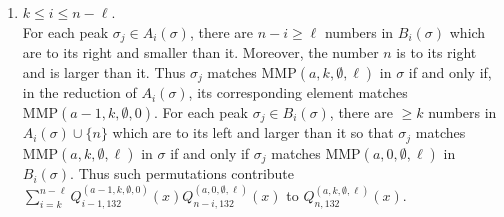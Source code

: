 \documentclass[
final,nomarks
]{dmtcs-episciences}
\newcommand{\Qmmn}[2]{Q_{#2,132}^{(#1)}(x)}
\newcommand{\MMP}{\mathrm{MMP}}
\begin{document}
\begin{enumerate}[{\bf Case }\bf 1.]
	\item \begin{math}k\leq i \leq n-\ell\end{math}.\\
	For each peak \begin{math}\sigma_j \in A_i(\sigma)\end{math},   
	there are \begin{math}n-i\geq \ell\end{math} numbers in \begin{math}B_i(\sigma)\end{math} which are to its right and smaller than it. 
	Moreover, the number \begin{math}n\end{math} is to its right and is larger than it.  
	Thus \begin{math}\sigma_j\end{math} matches \begin{math}\MMP(a,k,\emptyset,\ell)\end{math} in \begin{math}\sigma\end{math} if and only if, 
	in the reduction of \begin{math}A_i(\sigma)\end{math}, its corresponding element matches 
	\begin{math}\MMP(a-1,k,\emptyset,0)\end{math}. For each peak \begin{math}\sigma_j \in B_i(\sigma)\end{math},   
	there are \begin{math}\geq k\end{math} numbers in \begin{math}A_i(\sigma) \cup \{n\}\end{math} which are to its left  and larger  than it 
	so that \begin{math}\sigma_j\end{math} matches \begin{math}\MMP(a,k,\emptyset,\ell)\end{math} in \begin{math}\sigma\end{math} if and only if 
	\begin{math}\sigma_j\end{math} matches \begin{math}\MMP(a,0,\emptyset,\ell)\end{math} in \begin{math}B_i(\sigma)\end{math}.  
	Thus such 
	permutations contribute \begin{math}\sum_{i=k}^{n-\ell}\Qmmn{a-1,k,\emptyset,0}{i-1}\Qmmn{a,0,\emptyset,\ell}{n-i}\end{math} to 
	\begin{math}\Qmmn{a,k,\emptyset,\ell}{n}\end{math}.
	

\end{enumerate}
\end{document}
